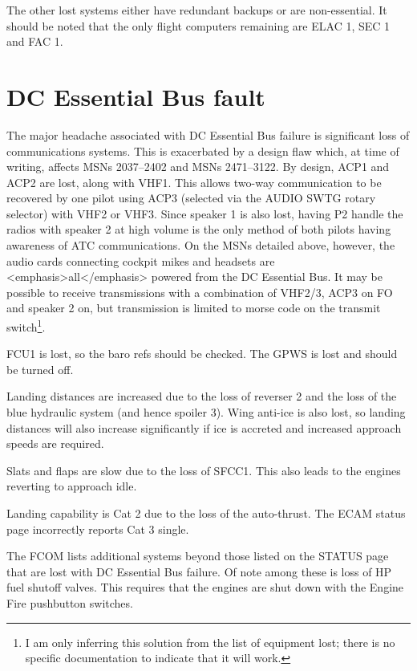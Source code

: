 \documentclass[a5paper,11pt,twoside]{book}
\newcommand{\inlcite}[1]{{\footnotesize\scshape\MakeLowercase{[#1]}}}
\newcommand{\multicite}[1]{%

  \nopagebreak
  \noindent{{\color{blue}\inlcite{#1}}}
}
\begin{document}
The other lost systems either have redundant backups or are non-essential. It
should be noted that the only flight computers remaining are ELAC 1, SEC 1 and
FAC 1.

\multicite{\uline{ELEC}~DC~BUS~2~FAULT, FCOM~PRO.AEP.ELEC}


\section{DC Essential Bus fault}

The major headache associated with DC Essential Bus failure is significant loss
of communications systems. This is exacerbated by a design flaw which, at time
of writing, affects MSNs 2037–2402 and MSNs 2471–3122. By design, ACP1 and ACP2
are lost, along with VHF1. This allows two-way communication to be recovered by
one pilot using ACP3 (selected via the AUDIO SWTG rotary selector) with VHF2 or
VHF3. Since speaker 1 is also lost, having P2 handle the radios with speaker 2
at high volume is the only method of both pilots having awareness of ATC
communications. On the MSNs detailed above, however, the audio cards connecting
cockpit mikes and headsets are <emphasis>all</emphasis> powered from the DC
Essential Bus. It may be possible to receive transmissions with a combination of
VHF2/3, ACP3 on FO and speaker 2 on, but transmission is limited to morse code
on the transmit switch\footnote{I am only inferring this solution from the list
of equipment lost; there is no specific documentation to indicate that it will
work.}.

FCU1 is lost, so the baro refs should be checked. The GPWS is lost and should be
turned off.

Landing distances are increased due to the loss of reverser 2 and the loss of
the blue hydraulic system (and hence spoiler 3). Wing anti-ice is also lost, so
landing distances will also increase significantly if ice is accreted and
increased approach speeds are required.

Slats and flaps are slow due to the loss of SFCC1. This also leads to the
engines reverting to approach idle.

Landing capability is Cat 2 due to the loss of the auto-thrust. The ECAM status
page incorrectly reports Cat 3 single.

The FCOM lists additional systems beyond those listed on the STATUS page that
are lost with DC Essential Bus failure. Of note among these is loss of HP fuel
shutoff valves. This requires that the engines are shut down with the Engine
Fire pushbutton switches.
\end{document}
